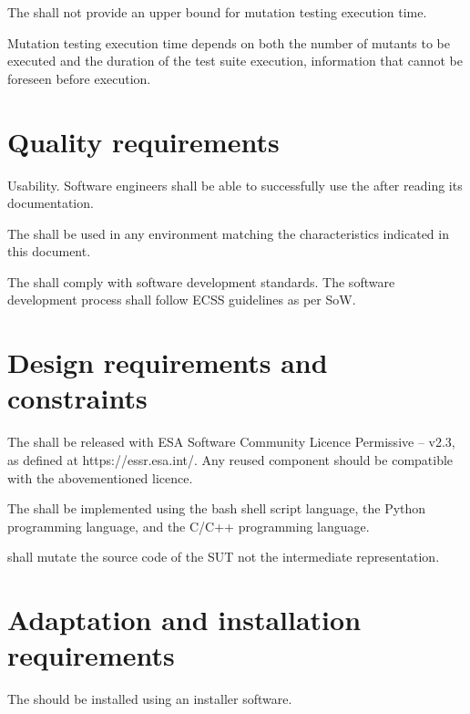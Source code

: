 
\RQ{} The \FAQAS shall not provide an upper bound for mutation testing execution time.

\remark Mutation testing execution time depends on both the number of mutants to be executed and the duration of the test suite execution, information that cannot be foreseen before execution.

\section{Quality requirements}

\RQ{} Usability. Software engineers shall be able to successfully use the \FAQAS after reading its documentation.

\RQ{} The \FAQAS shall be used in any environment matching the characteristics indicated in this document.

\RQ{} The \FAQAS shall comply with software development standards. The software development process shall follow ECSS guidelines as per SoW.


\section{Design requirements and constraints}

\RQ{} The \FAQAS shall be released with ESA Software Community Licence Permissive – v2.3, as defined at https://essr.esa.int/. Any reused component should be compatible with the abovementioned licence.

\RQ{} The \FAQAS shall be implemented using the bash shell script language, the Python programming language, and the C/C++ programming language.

\RQ{} \FAQAS shall mutate the source code of the SUT not the intermediate representation.


\section{Adaptation and installation requirements}


%
\RQ{} The \FAQAS should be installed using an installer software.


